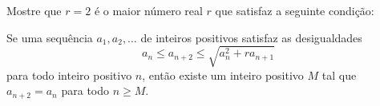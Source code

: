 Mostre que $r=2$ é o maior número real $r$ que satisfaz a seguinte condição:

Se uma sequência $a_1, a_2, \dots$ de inteiros positivos satisfaz as desigualdades \[ a_n \le a_{n+2} \le \sqrt{a_n^2 + ra_{n+1}}\] para todo inteiro positivo $n$, então existe um inteiro positivo $M$ tal que $a_{n+2} = a_n$ para todo $n \ge M$.
